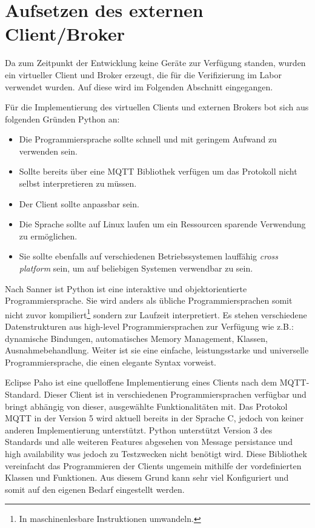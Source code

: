 \section{Aufsetzen des externen Client/Broker}
    Da zum Zeitpunkt der Entwicklung keine Geräte zur Verfügung standen, wurden ein virtueller Client und Broker erzeugt, die für die Verifizierung im Labor verwendet wurden.
    Auf diese wird im Folgenden Abschnitt eingegangen.


    Für die Implementierung des virtuellen Clients und externen Brokers bot sich aus folgenden Gründen Python an:
    \begin{itemize}
        \item Die Programmiersprache sollte schnell und mit geringem Aufwand zu verwenden sein.
        \item Sollte bereits über eine \ac{MQTT} Bibliothek verfügen um das Protokoll nicht selbst interpretieren zu müssen.
        \item Der Client sollte anpassbar sein.
        \item Die Sprache sollte auf Linux laufen um ein Ressourcen sparende Verwendung zu ermöglichen.
        \item Sie sollte ebenfalls auf verschiedenen Betriebssystemen lauffähig \emph{cross platform} sein, um auf beliebigen Systemen verwendbar zu sein.
    \end{itemize}
    Nach Sanner ist Python ist eine interaktive und objektorientierte Programmiersprache. Sie wird anders als übliche Programmiersprachen somit nicht zuvor kompiliert\footnote{In maschinenlesbare Instruktionen umwandeln.} sondern zur Laufzeit interpretiert.
    Es stehen verschiedene Datenstrukturen aus high-level Programmiersprachen zur Verfügung wie z.B.: dynamische Bindungen, automatisches Memory Management, Klassen, Ausnahmebehandlung. Weiter ist sie eine einfache, leistungsstarke und universelle Programmiersprache, die einen elegante Syntax vorweist. \cite{sanner1999python}
        
    Eclipse Paho ist eine quelloffene Implementierung eines Clients nach dem \ac{MQTT}-Standard. Dieser Client ist in verschiedenen Programmiersprachen verfügbar und bringt abhängig von dieser, ausgewählte Funktionalitäten mit.
    Das Protokol \ac{MQTT} in der Version 5 wird aktuell bereits in der Sprache C, jedoch von keiner anderen Implementierung unterstützt. Python unterstützt Version 3 des Standards und alle weiteren Features abgesehen von \glqq Message persistance\grqq{} und \glqq high availability\grqq{} was jedoch zu Testzwecken nicht benötigt wird. \cite{eclipse_foundation2017}
    Diese Bibliothek vereinfacht das Programmieren der Clients ungemein mithilfe der vordefinierten Klassen und Funktionen.
    Aus diesem Grund kann sehr viel Konfiguriert und somit auf den eigenen Bedarf eingestellt werden. 

